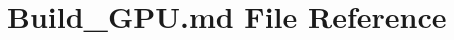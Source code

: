 \hypertarget{Build__GPU_8md}{\section{Build\-\_\-\-G\-P\-U.\-md File Reference}
\label{Build__GPU_8md}
}

